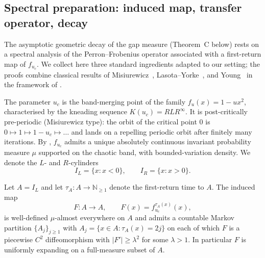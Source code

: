 
\subsection{Spectral preparation: induced map, transfer operator, decay}
\label{ssec:spectral}

The asymptotic geometric decay of the gap measure (Theorem~C below)
rests on a spectral analysis of the Perron--Frobenius operator
associated with a first-return map of $f_{u_c}$. We collect here three
standard ingredients adapted to our setting; the proofs combine
classical results of Misiurewicz~\cite{misiurewicz1981absolutely},
Lasota--Yorke~\cite{lasota1973existence}, and Young~\cite{young1992decay}
in the framework of \cite{baladi2000positive}.

The parameter $u_c$ is the band-merging point of the family
$f_u(x) = 1 - u x^2$, characterised by the kneading sequence
$K(u_c) = R L R^\infty$. It is post-critically pre-periodic
(Misiurewicz type): the orbit of the critical point $0$ is
$0 \mapsto 1 \mapsto 1 - u_c \mapsto \ldots$ and lands on a repelling
periodic orbit after finitely many iterations. By
\cite{misiurewicz1981absolutely}, $f_{u_c}$ admits a unique absolutely
continuous invariant probability measure $\mu$ supported on the chaotic
band, with bounded-variation density. We denote the $L$- and $R$-cylinders
\[
    I_L = \{x : x < 0\}, \qquad I_R = \{x : x > 0\}.
\]

\begin{lemma}
\label{lem:induced}
Let $A = I_L$ and let $\tau_A : A \to \mathbb{N}_{\geq 1}$ denote the
first-return time to $A$. The induced map
\[
    F : A \to A, \qquad F(x) = f_{u_c}^{\tau_A(x)}(x),
\]
is well-defined $\mu$-almost everywhere on $A$ and admits a countable
Markov partition $\{A_j\}_{j \geq 1}$ with $A_j = \{ x \in A : \tau_A(x) = 2j \}$
on each of which $F$ is a piecewise $C^2$ diffeomorphism with
$|F'| \geq \lambda^{2}$ for some $\lambda > 1$. In particular $F$ is
uniformly expanding on a full-measure subset of $A$.
\end{lemma}

